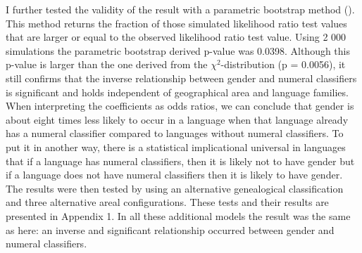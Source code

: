 \documentclass[output=collectionpaper]{langsci/langscibook}
\begin{document}
I further tested the validity of the result with a parametric bootstrap method (\citealt{Halekoh2014}). This method returns the fraction of those simulated likelihood ratio test values that are larger or equal to the observed likelihood ratio test value. Using 2 000 simulations the parametric bootstrap derived p-value was 0.0398. Although this p-value is larger than the one derived from the $\chi^2$-distribution (p = 0.0056), it still confirms that the inverse relationship between gender and numeral classifiers is significant and holds independent of geographical area and language families. When interpreting the coefficients as odds ratios, we can conclude that gender is about eight times less likely to occur in a language when that language already has a numeral classifier compared to languages without numeral classifiers. To put it in another way, there is a statistical implicational universal in languages that if a language has numeral classifiers, then it is likely not to have gender but if a language does not have numeral classifiers then it is likely to have gender. The results were then tested by using an alternative genealogical classification and three alternative areal configurations. These tests and their results are presented in Appendix 1. In all these additional models the result was the same as here: an inverse and significant relationship occurred between gender and numeral classifiers.
\end{document}
